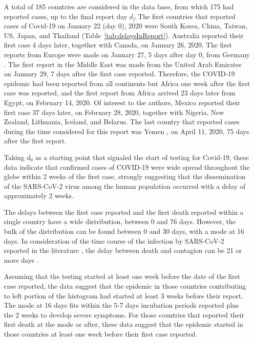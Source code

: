 \documentclass[8pt]{article}
\begin{document}
A total of 185 countries are considered in the data base, from which 175 had reported cases, up to the final report day $d_f$ 
The first countries that reported cases of Covid-19 on January 22 (day 0), 2020 were South Korea, China, Taiwan, US, Japan, and Thailand (Table~\ref{tab:delaysInReport}). Australia reported their first case 4 days later, together with Canada, on January 26, 2020. The first reports from Europe were made  on January 27, 5 days after day 0, from Germany \citep{rothe2020transmission}. The first report in the Middle East was made from the United Arab Emirates on January 29, 7 days after the first case reported.  Therefore, the COVID-19 epidemic had been reported from all continents but Africa one week after the first case was reported, and the first report from Africa arrived 23 days later from Egypt, on February 14, 2020. Of interest to the authors, Mexico reported their first case 37 days later, on February 28, 2020, together with Nigeria, New Zealand, Lithuania, Iceland, and Belarus. The last country that reported cases during the time considered for this report was Yemen , on April 11, 2020, 75 days after the first report.

Taking $d_0$ as a starting point that signaled the start of testing for Covid-19, these data indicate that confirmed  cases of COVID-19 were wide spread throughout the globe within 2 weeks of the first case, strongly suggesting that the dissemination of the SARS-CoV-2 virus among the human population occurred with a delay of approximately 2 weeks. 


The delays between the first case reported and the first death reported within a single country have a wide distribution, between 0 and 76 days. 
However, the bulk of the distribution can be found between 0 and 30 days, with a mode at 16 days. In consideration of the time course of the infection by SARS-CoV-2 reported in the literature \citep{}, the delay between death and contagion can be 21 or more days \citep{}. 

Assuming that the testing started at least one week before the date of the first case reported, the data suggest that the epidemic in those countries contributing to left portion of the histogram had started at least 3 weeks before their report. The mode at 16 days fits within the 5-7 days incubation periods reported plus the 2 weeks to develop severe symptoms. For those countries that reported their first death at the mode or after, these data suggest that the epidemic started in those countries at least one week before their first case reported.
\end{document}
